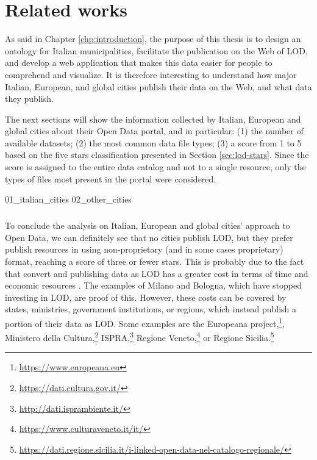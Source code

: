 \chapter{Related works}
\label{chp:related}

As said in Chapter \ref{chp:introduction}, the purpose of this thesis is to design an ontology for Italian municipalities, facilitate the publication on the Web of \acl{LOD}, and develop a web application that makes this data easier for people to comprehend and visualize. It is therefore interesting to understand how major Italian, European, and global cities publish their data on the Web, and what data they publish. 

The next sections will show the information collected by Italian, European and global cities about their Open Data portal, and in particular: (1) the number of available datasets; (2) the most common data file types; (3) a score from 1 to 5 based on the five stars classification presented in Section \ref{sec:lod-stars}. Since the score is assigned to the entire data catalog and not to a single resource, only the types of files most present in the portal were considered.

{01_italian_cities}%
{02_other_cities}%

\paragraph*{}
To conclude the analysis on Italian, European and global cities' approach to Open Data, we can definitely see that no cities publish \acl{LOD}, but they prefer publish resources in using non-proprietary (and in some cases proprietary) format, reaching a score of three or fewer stars. This is probably due to the fact that convert and publishing data as \acl{LOD} has a greater cost in terms of time and economic resources \cite{bauer2011linked}. The examples of Milano and Bologna, which have stopped investing in \acl{LOD}, are proof of this. However, these costs can be covered by states, ministries, government institutions, or regions, which instead publish a portion of their data as \acl{LOD}. Some examples are the Europeana project,\footnote{\url{https://www.europeana.eu}}, Ministero della Cultura,\footnote{\url{https://dati.cultura.gov.it/}} ISPRA,\footnote{\url{http://dati.isprambiente.it/}} Regione Veneto,\footnote{\url{https://www.culturaveneto.it/it/}} or Regione Sicilia.\footnote{\url{https://dati.regione.sicilia.it/i-linked-open-data-nel-catalogo-regionale/}}

